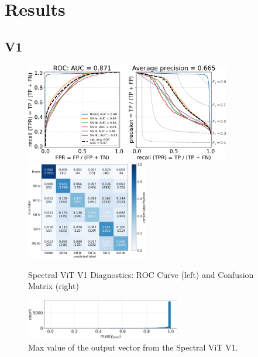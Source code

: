 \chapter{Results}
\label{chap:chapter-4}


\section{V1}\label{sec:v1_results}


\begin{figure}
    \centering
    \includegraphics[height=4.3cm]{figures/v1_real/vit_model_V1_original_redorocfulle_e31.png}
    \quad
    \includegraphics[height=4.3cm]{figures/v1_real/vit_model_V1_original_redocmfull_e31.png}
    \caption{Spectral ViT V1 Diagnostics: ROC Curve (left) and Confusion Matrix (right)\label{fig:v1_qual}}
\end{figure}

\begin{figure}
    \centering
    \includegraphics[width=0.6\textwidth]{figures/v1_real/vit_model_V1_original_redomax_ypred_binary_31.png}
    \caption{Max value of the output vector from the Spectral ViT V1.\label{fig:v1_max}}
\end{figure}




